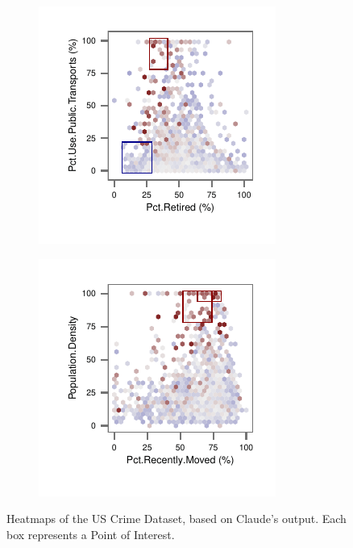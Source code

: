 \begin{figure}[t!]
    \begin{subfigure}[b]{0.42\columnwidth}
    \includegraphics[width=\textwidth]{plots/crime5}
    \end{subfigure}
    \begin{subfigure}[b]{0.42\columnwidth}
    \includegraphics[width=\textwidth]{plots/crime6}
    \end{subfigure}
\caption{Heatmaps of the US Crime Dataset, based on Claude's output. Each box
represents a Point of Interest.}
\label{pic:crime_charts}
\end{figure}


